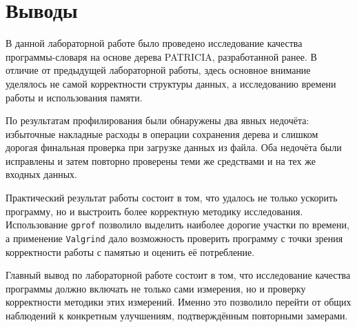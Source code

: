 \section{Выводы}

В данной лабораторной работе было проведено исследование качества программы-словаря на основе дерева PATRICIA, разработанной ранее. В отличие от предыдущей лабораторной работы, здесь основное внимание уделялось не самой корректности структуры данных, а исследованию времени работы и использования памяти.

По результатам профилирования были обнаружены два явных недочёта: избыточные накладные расходы в операции сохранения дерева и слишком дорогая финальная проверка при загрузке данных из файла. Оба недочёта были исправлены и затем повторно проверены теми же средствами и на тех же входных данных.

Практический результат работы состоит в том, что удалось не только ускорить программу, но и выстроить более корректную методику исследования. Использование \texttt{gprof} позволило выделить наиболее дорогие участки по времени, а применение \texttt{Valgrind} дало возможность проверить программу с точки зрения корректности работы с памятью и оценить её потребление.

Главный вывод по лабораторной работе состоит в том, что исследование качества программы должно включать не только сами измерения, но и проверку корректности методики этих измерений. Именно это позволило перейти от общих наблюдений к конкретным улучшениям, подтверждённым повторными замерами.
\pagebreak
